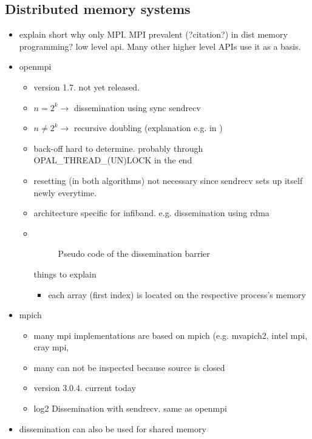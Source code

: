 \documentclass[a4paper, 10pt]{article}
\begin{document}
\subsection{Distributed memory systems}
\begin{itemize}
	\item explain short why only MPI. MPI prevalent (?citation?) in dist memory programming? low level api. Many other higher level APIs use it as a basis.
	\item openmpi
		\begin{itemize}
			\item version 1.7. not yet released.
			\item $n = 2^k \rightarrow$ dissemination\cite{hensgen1988} using sync sendrecv
			\item $n \neq 2^k \rightarrow$ recursive doubling (explanation e.g. in \cite{hoefler2005})
			\item back-off hard to determine. probably through OPAL\_THREAD\_(UN)LOCK in the end
			\item resetting (in both algorithms) not necessary since sendrecv sets up itself newly everytime.
			\item architecture specific for infiband. e.g. dissemination using rdma \cite{hoefler2006}
			\item ~
				\begin{figure}[htbp]
					\centering
					
					\caption{Pseudo code of the dissemination barrier}
					\label{listing:dissemination-no-reset}
				\end{figure}
				things to explain
				\begin{itemize}
					\item each array (first index) is located on the respective process's memory
				\end{itemize}

		\end{itemize}
	\item mpich
		\begin{itemize}
			\item many mpi implementations are based on mpich (e.g. mvapich2, intel mpi, cray mpi,
			\item many can not be inspected because source is closed
			\item version 3.0.4. current today
			\item log2 Dissemination with sendrecv. same as openmpi
		\end{itemize}
	\item dissemination can also be used for shared memory\cite{hoefler2013}
\end{itemize}
\end{document}
